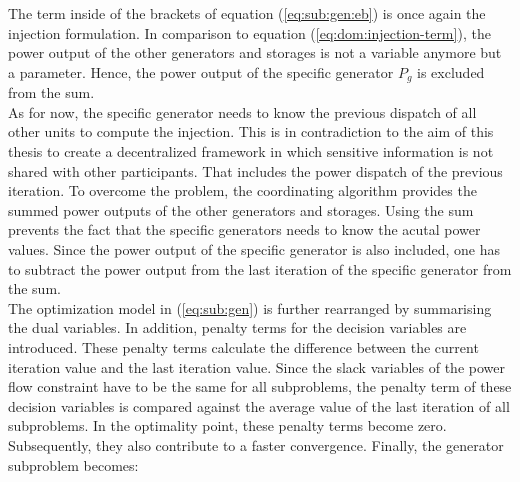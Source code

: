  The term inside of the brackets of equation (\ref{eq:sub:gen:eb}) is once again the injection formulation. In comparison to equation (\ref{eq:dom:injection-term}), the power output of the other generators and storages is not a variable anymore but a parameter. Hence, the power output of the specific generator $P_{g}$ is excluded from the sum.\\
 
 As for now, the specific generator needs to know the previous dispatch of all other units to compute the injection. This is in contradiction to the aim of this thesis to create a decentralized framework in which sensitive information is not shared with other participants. That includes the power dispatch of the previous iteration. To overcome the problem, the coordinating algorithm provides the summed power outputs of the other generators and storages. Using the sum prevents the fact that the specific generators needs to know the acutal power values. Since the power output of the specific generator is also included, one has to subtract the power output from the last iteration of the specific generator from the sum. \\
 
 The optimization model in (\ref{eq:sub:gen}) is further rearranged by summarising the dual variables. In addition, penalty terms for the decision variables are introduced. These penalty terms calculate the difference between the current iteration value and the last iteration value. Since the slack variables of the power flow constraint have to be the same for all subproblems, the penalty term of these decision variables is compared against the average value of the last iteration of all subproblems. In the optimality point, these penalty terms become zero. Subsequently, they also contribute to a faster convergence. Finally, the generator subproblem becomes:
 
